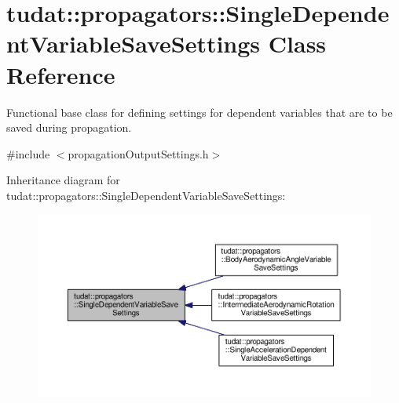 \hypertarget{classtudat_1_1propagators_1_1SingleDependentVariableSaveSettings}{}\section{tudat\+:\+:propagators\+:\+:Single\+Dependent\+Variable\+Save\+Settings Class Reference}
\label{classtudat_1_1propagators_1_1SingleDependentVariableSaveSettings}


Functional base class for defining settings for dependent variables that are to be saved during propagation.  




{\ttfamily \#include $<$propagation\+Output\+Settings.\+h$>$}



Inheritance diagram for tudat\+:\+:propagators\+:\+:Single\+Dependent\+Variable\+Save\+Settings\+:
\nopagebreak
\begin{figure}[H]
\begin{center}
\leavevmode
\includegraphics[width=350pt]{classtudat_1_1propagators_1_1SingleDependentVariableSaveSettings__inherit__graph}
\end{center}
\end{figure}
